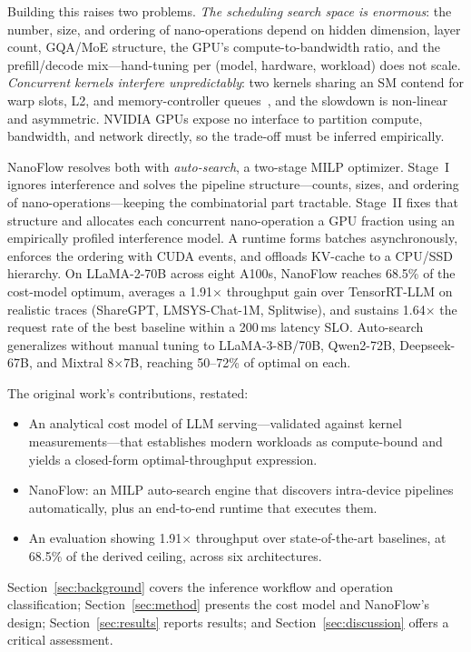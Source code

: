 \documentclass[manuscript,review]{acmart}
\newcommand{\nf}{NanoFlow\xspace}   %
\begin{document}
Building this raises two problems. \emph{The scheduling search space is enormous}: the number, size, and 
ordering of nano-operations depend on hidden dimension, layer count, GQA/MoE structure, the GPU's 
compute-to-bandwidth ratio, and the prefill/decode mix---hand-tuning per (model, hardware, workload) does 
not scale. \emph{Concurrent kernels interfere unpredictably}: two kernels sharing an SM contend for warp 
slots, L2, and memory-controller queues~\cite{strati2024orion}, and the slowdown is non-linear and asymmetric. 
NVIDIA GPUs expose no interface to partition compute, bandwidth, and network directly, so the trade-off must 
be inferred empirically.

\nf resolves both with \emph{auto-search}, a two-stage MILP optimizer. Stage~I ignores interference and solves 
the pipeline structure---counts, sizes, and ordering of nano-operations---keeping the combinatorial part 
tractable. Stage~II fixes that structure and allocates each concurrent nano-operation a GPU fraction using an 
empirically profiled interference model. A runtime forms batches asynchronously, enforces the ordering with CUDA 
events, and offloads KV-cache to a CPU/SSD hierarchy. On LLaMA-2-70B across eight A100s, \nf reaches 68.5\% of 
the cost-model optimum, averages a 1.91$\times$ throughput gain over TensorRT-LLM on realistic traces 
(ShareGPT, LMSYS-Chat-1M, Splitwise), and sustains 1.64$\times$ the request rate of the best baseline within a 
200\,ms latency SLO. Auto-search generalizes without manual tuning to LLaMA-3-8B/70B, Qwen2-72B, Deepseek-67B, 
and Mixtral 8$\times$7B, reaching 50--72\% of optimal on each.

The original work's contributions, restated:

\begin{itemize}
  \item An analytical cost model of LLM serving---validated against kernel
        measurements---that establishes modern workloads as compute-bound and
        yields a closed-form optimal-throughput expression.
  \item \nf: an MILP auto-search engine that discovers intra-device pipelines
        automatically, plus an end-to-end runtime that executes them.
  \item An evaluation showing 1.91$\times$ throughput over state-of-the-art
        baselines, at 68.5\% of the derived ceiling, across six architectures.
\end{itemize}

\noindent Section~\ref{sec:background} covers the inference workflow and
operation classification; Section~\ref{sec:method} presents the cost model and
\nf's design; Section~\ref{sec:results} reports results; and
Section~\ref{sec:discussion} offers a critical assessment.
\end{document}

